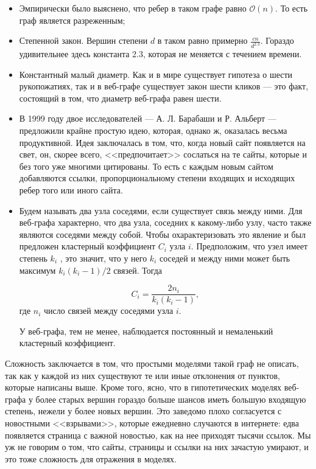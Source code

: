 \begin{itemize}
  \item Эмпирически было выяснено, что ребер в таком графе равно $\mathcal{O}(n)$.
  То есть граф является разреженным;
  \item Степенной закон. Вершин степени $d$ в таком равно примерно $\frac{cn}{d^{2.3}}$.
  Гораздо удивительнее здесь константа 2.3, которая не меняется с течением времени.
  \item Константный малый диаметр. Как и в мире существует гипотеза о шести рукопожатиях,
  так и в веб-графе существует закон шести кликов --- это факт, состоящий в том,
  что диаметр веб-графа равен шести.
  \item В 1999 году двое исследователей --- А. Л. Барабаши и Р. Альберт --- 
  предложили крайне простую идею, которая, однако ж, оказалась весьма продуктивной.
  Идея заключалась в том, что, когда новый сайт появляется на свет, он, скорее 
  всего, <<предпочитает>> сослаться на те сайты, которые и без того уже многими 
  цитированы. То есть с каждым новым сайтом добавляются ссылки, пропорциональному
  степени входящих и исходящих ребер того или иного сайта.
  \item Будем называть два узла соседями, если существует связь между ними. 
  Для веб-графа характерно, что два узла, соседних к какому-либо узлу, 
  часто также являются соседями между собой. Чтобы охарактеризовать это явление 
  и был предложен кластерный коэффициент $C_i$ узла $i$.
  Предположим, что узел имеет степень $k_i$ , это значит, что у него $k_i$ соседей
  и между ними может быть максимум $k_i (k_i - 1)/2$ связей. Тогда

  \[ 
  C_i = \frac{2 n_i}{k_i (k_i - 1)},
  \]
  где $n_i$ число связей между соседями узла $i$.

  У веб-графа, тем не менее, наблюдается постоянный и немаленький
  кластерный коэффициент.
\end{itemize}

Сложность заключается в том, что простыми моделями такой граф не описать, так
как у каждой из них существуют те или иные отклонения от пунктов, которые написаны
выше. Кроме того, ясно, что в гипотетических моделях веб-графа
у более старых вершин гораздо больше шансов
иметь большую входящую степень, нежели у более новых вершин. Это заведомо плохо
согласуется с новостными <<взрывами>>, которые ежедневно случаются в интернете: 
едва появляется страница с важной новостью, как на нее приходят тысячи ссылок.
Мы уж не говорим о том, что сайты, страницы и ссылки на них зачастую умирают,
и это тоже сложность для отражения в моделях.

